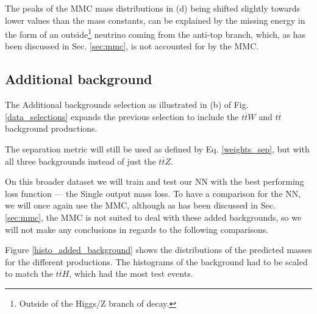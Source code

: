 \documentclass{ctuthesis}
\begin{document}
The peaks of the MMC mass distributions in (d) being shifted slightly towards lower values than the mass constants, can be explained by the missing energy in the form of an outside\footnote{Outside of the Higgs/Z branch of decay.} neutrino coming from the anti-top branch, which, as has been discussed in Sec. \ref{sec:mmc}, is not accounted for by the MMC.

\subsection{Additional background}
The Additional backgrounds selection as illustrated in (b) of Fig. \ref{data_selections} expands the previous selection to include the $t\overline{t}W$ and $t\overline{t}$ background productions.

The separation metric will still be used as defined by Eq. \ref{weights_sep}, but with all three backgrounds instead of just the $t\overline{t}Z$.

On this broader dataset we will train and test our NN with the best performing loss function — the Single output mass loss. To have a comparison for the NN, we will once again use the MMC, although as has been discussed in Sec. \ref{sec:mmc}, the MMC is not suited to deal with these added backgrounds, so we will not make any conclusions in regards to the following comparisons.

Figure \ref{histo_added_background} shows the distributions of the predicted masses for the different productions. The histograms of the background had to be scaled to match the $t\overline{t}H$, which had the most test events.

\begin{figure}[h]
\end{figure}
\end{document}
